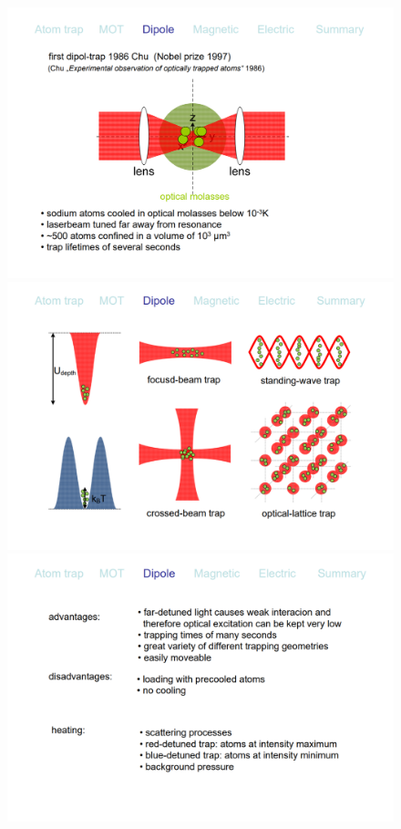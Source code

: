 \documentclass{report}
\theoremstyle{definition}
\begin{document}
\begin{itemize}
\begin{itemize}
\begin{figure}[!htb]
		\includegraphics[scale=0.3]{slide4}
		\includegraphics[scale=0.3]{slide5}
		\includegraphics[scale=0.3]{slide6}
	\end{figure}
		
	\end{itemize}





\end{itemize}
\end{document}
